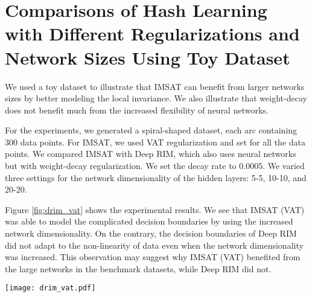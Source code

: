 \documentclass{article}
\theoremstyle{plain}
\begin{document}
\section{Comparisons of Hash Learning with Different Regularizations and Network Sizes Using Toy Dataset} \label{app:hash_toy}
We used a toy dataset to illustrate that IMSAT can benefit from larger networks sizes by better modeling the local invariance. We also illustrate that weight-decay does not benefit much from the increased flexibility of neural networks.

For the experiments, we generated a spiral-shaped dataset, each arc containing 300 data points. 
For IMSAT, we used VAT regularization and set  for all the data points.
We compared IMSAT with Deep RIM, which also uses neural networks but with weight-decay regularization. We set the decay rate to 0.0005.
We varied three settings for the network dimensionality of the hidden layers: 5-5, 10-10, and 20-20.

Figure \ref{fig:drim_vat} shows the experimental results.
We see that IMSAT (VAT) was able to model the complicated decision boundaries by using the increased network dimensionality. 
On the contrary, the decision boundaries of Deep RIM did not adapt to the non-linearity of data even when the network dimensionality was increased.
This observation may suggest why IMSAT (VAT) benefited from the large networks in the benchmark datasets, while Deep RIM did not.

\begin{figure*}[t]
\begin{center}
\centerline{\texttt{[image: drim\_vat.pdf]}}
\vspace{-0.3cm}
\caption{Comparisons of hash learning with the different regularizations and network sizes using toy datasets.}\label{fig:drim_vat}
\end{center}
\vspace{-0.8cm}
\end{figure*} 
\end{document}
